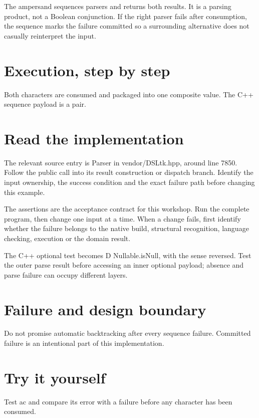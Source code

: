 \clearpage
{}
The ampersand sequences parsers and returns both results. It is a parsing product, not a Boolean conjunction. If the right parser fails after consumption, the sequence marks the failure committed so a surrounding alternative does not casually reinterpret the input.


\section*{Execution, step by step}
Both characters are consumed and packaged into one composite value. The C++ sequence payload is a pair.

\section*{Read the implementation}
The relevant source entry is Parser in vendor/DSLtk.hpp, around line 7850. Follow the public call into its result construction or dispatch branch. Identify the input ownership, the success condition and the exact failure path before changing this example.

The assertions are the acceptance contract for this workshop. Run the complete program, then change one input at a time. When a change fails, first identify whether the failure belongs to the native build, structural recognition, language checking, execution or the domain result.

\clearpage
{}
The C++ optional test becomes D Nullable.isNull, with the sense reversed. Test the outer parse result before accessing an inner optional payload; absence and parse failure can occupy different layers.


\section*{Failure and design boundary}
Do not promise automatic backtracking after every sequence failure. Committed failure is an intentional part of this implementation.

\section*{Try it yourself}
Test ac and compare its error with a failure before any character has been consumed.

